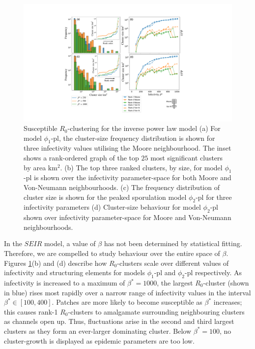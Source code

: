 \begin{figure}
    \centering
    \includegraphics[scale=0.45]{chapter6/figures/fig6-pl-cluster-distribution.pdf}
    \caption{Susceptible $R_0$-clustering for the inverse power law model (a) For model $\phi_1$-pl, the cluster-size frequency distribution is shown for three infectivity values utilising the Moore neighbourhood. The inset shows a rank-ordered graph of the top $25$ most significant clusters by area $\mathrm{km^2}$. (b) The top three ranked clusters, by size, for model $\phi_1$-pl is shown over the infectivity parameter-space for both Moore and Von-Neumann neighbourhoods. (c) The frequency distribution of cluster size is shown for the peaked sporulation model $\phi_2$-pl for three infectivity parameters (d) Cluster-size behaviour for model $\phi_2$-pl shown over infectivity parameter-space for Moore and Von-Neumann neighbourhoods.}
    \label{fig:inverse-power-law-clustering}
\end{figure}

In the $SEIR$ model, a value of $\beta$ has not been determined by statistical fitting.
Therefore, we are compelled to study behaviour over the entire space of $\beta$.
Figures \ref{fig:inverse-power-law-clustering}(b) and (d) describe how $R_0$-clusters scale over different values of infectivity and structuring elements for models $\phi_1$-pl and $\phi_2$-pl respectively.
As infectivity is increased to a maximum of $\beta^*=1000$, the largest $R_0$-cluster (shown in blue) rises most rapidly over a narrow range of infectivity values in the interval $\beta^*\in [100, 400]$.
Patches are more likely to become susceptible as $\beta^*$ increases; this causes rank-1 $R_0$-clusters to amalgamate surrounding neighbouring clusters as channels open up.
Thus, fluctuations arise in the second and third largest clusters as they form an ever-larger dominating cluster.
Below $\beta^*=100$, no cluster-growth is displayed as epidemic parameters are too low. 
 
